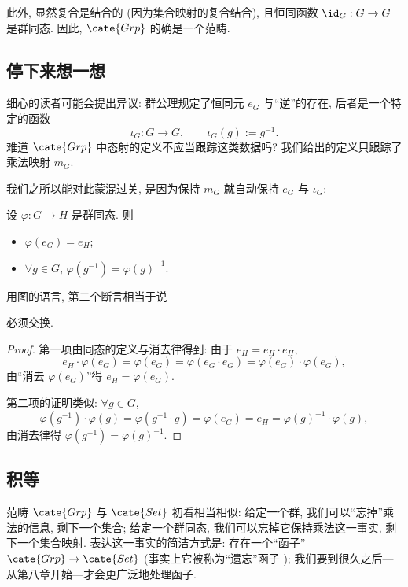 此外, 显然复合是结合的 (因为集合映射的复合结合), 且恒同函数 $\id_G : G \to G$ 是群同态. 因此, $\cate{Grp}$ 的确是一个范畴.

\subsection{停下来想一想}
\label{subsec:pause}

细心的读者可能会提出异议: 群公理规定了恒同元 $e_G$ 与``逆''的存在, 后者是一个特定的函数
\[
\iota_G : G \to G, \qquad \iota_G(g) := g^{-1}.
\]
难道 $\cate{Grp}$ 中态射的定义不应当跟踪这类数据吗? 我们给出的定义只跟踪了乘法映射 $m_G$.

我们之所以能对此蒙混过关, 是因为保持 $m_G$ 就自动保持 $e_G$ 与 $\iota_G$:

\begin{proposition}
\label{prop:hom-preserves}
设 $\varphi : G \to H$ 是群同态. 则
\begin{itemize}
	\item $\varphi(e_G) = e_H$;
	\item $\forall g \in G$, $\varphi(g^{-1}) = \varphi(g)^{-1}$.
\end{itemize}
\end{proposition}

用图的语言, 第二个断言相当于说
\begin{center}
\end{center}
必须交换.

\begin{proof}
第一项由同态的定义与消去律得到: 由于 $e_H = e_H \cdot e_H$,
\[
e_H \cdot \varphi(e_G) = \varphi(e_G) = \varphi(e_G \cdot e_G) = \varphi(e_G) \cdot \varphi(e_G),
\]
由``消去 $\varphi(e_G)$''得 $e_H = \varphi(e_G)$.

第二项的证明类似: $\forall g \in G$,
\[
\varphi(g^{-1}) \cdot \varphi(g) = \varphi(g^{-1} \cdot g) = \varphi(e_G) = e_H = \varphi(g)^{-1} \cdot \varphi(g),
\]
由消去律得 $\varphi(g^{-1}) = \varphi(g)^{-1}$.
\end{proof}

\subsection{积等}
\label{subsec:products-grp}

范畴 $\cate{Grp}$ 与 $\cate{Set}$ 初看相当相似: 给定一个群, 我们可以``忘掉''乘法的信息, 剩下一个集合; 给定一个群同态, 我们可以忘掉它保持乘法这一事实, 剩下一个集合映射. 表达这一事实的简洁方式是: 存在一个``函子''$\cate{Grp} \to \cate{Set}$ (事实上它被称为``遗忘''函子%
); 我们要到很久之后---从第八章开始---才会更广泛地处理函子.


